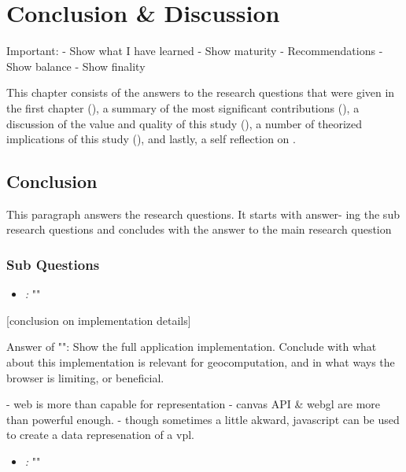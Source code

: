 \chapter{Conclusion \& Discussion}
\label{chap:conclusion}

\begin{note}
  Important: 
  - Show what I have learned
  - Show maturity
  - Recommendations 
  - Show balance
  - Show finality
\end{note}

This chapter consists of the answers to the research
questions that were given in the first chapter (), 
a summary of the most significant contributions (), 
a discussion of the value and quality of this study (),
a number of theorized implications of this study (),
and lastly, a self reflection on .

\section{Conclusion}
\label{sec:conclusion}

This paragraph answers the research questions. 
It starts with answer-
ing the sub research questions and concludes with the answer to the
main research question

\subsection*{Sub Questions}

\begin{itemize}[ ]
  \item \emph{\mySubRQOneTitle:} "\mySubRQOne"
\end{itemize}

[conclusion on implementation details]

Answer of "\mySubRQOneTitle": Show the full application implementation. Conclude with what about this implementation is relevant for geocomputation, and in what ways the browser is limiting, or beneficial.  

- web is more than capable for representation
  - canvas API \& webgl are more than powerful enough. 
  - though sometimes a little akward, javascript can be used to create a data represenation of a vpl. 
   
\begin{itemize}[ ]
  \item \emph{\mySubRQTwoTitle:} "\mySubRQTwo"
\end{itemize}

